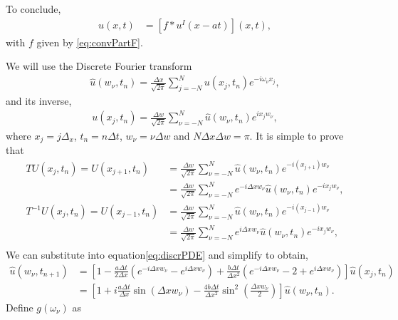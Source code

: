 \begin{questions}
\begin{solution}
To conclude,
\begin{align}
u(x,t)&=\left[f*u^I(x-at)\right](x,t),
\end{align}
with $f$ given by \eqref{eq:convPartF}.

\end{solution}
\newpage
{}
\begin{solution}
We will use the Discrete Fourier transform 
\begin{align}\label{eq:DiscrFourierTransf}
\hat{u}(w_{\nu},t_n)=\frac{\Delta x}{\sqrt{2\pi}}\sum_{j=-N}^N u(x_j,t_n)e^{-i\omega_{\nu} x_j},
\end{align}
and its inverse,
\begin{align}\label{eq:DiscrInvFourierTransf}
u(x_j,t_n)=\frac{\Delta w}{\sqrt{2\pi}}\sum_{\nu=-N}^N \hat{u}(w_{\nu},t_n)e^{ix_jw_{\nu}},
\end{align}
where $x_j = j\Delta_x$, $t_n=n\Delta t$, $w_{\nu}=\nu\Delta w$ and $N\Delta x\Delta w=\pi$. It is simple to prove that
\begin{align*}
TU(x_j,t_n)=U(x_{j+1},t_n)&=\frac{\Delta w}{\sqrt{2\pi}}\sum_{\nu=-N}^N \hat{u}(w_{\nu},t_n)e^{-i(x_{j+1})w_{\nu}}\\
&=\frac{\Delta w}{\sqrt{2\pi}}\sum_{\nu=-N}^N e^{-i\Delta xw_{\nu}}\hat{u}(w_{\nu},t_n)e^{-ix_jw_{\nu}},\\
T^{-1}U(x_j,t_n)=U(x_{j-1},t_n)&=\frac{\Delta w}{\sqrt{2\pi}}\sum_{\nu=-N}^N \hat{u}(w_{\nu},t_n)e^{-i(x_{j-1})w_{\nu}}\\
&=\frac{\Delta w}{\sqrt{2\pi}}\sum_{\nu=-N}^N e^{i\Delta xw_{\nu}}\hat{u}(w_{\nu},t_n)e^{-ix_jw_{\nu}},\\
\end{align*}
We can substitute into equation\eqref{eq:discrPDE} and simplify to obtain,
\begin{align}
\hat{u}(w_{\nu}, t_{n+1}) &= \left[1-\frac{a\Delta t}{ 2\Delta x}(e^{-i\Delta xw_{\nu}}-e^{i\Delta xw_{\nu}})+\frac{b\Delta t}{\Delta x^2}(e^{-i\Delta xw_{\nu}}-2+e^{i\Delta xw_{\nu}})\right]\hat{u}(x_j, t_n)\nonumber\\
&= \left[1+i\frac{a\Delta t}{ \Delta x}\sin\left(\Delta xw_{\nu}\right)-\frac{4b\Delta t}{\Delta x^2}\sin^2\left(\frac{\Delta xw_{\nu}}{2}\right)\right]\hat{u}(w_{\nu}, t_n).
\end{align}
Define $g(\omega_{\nu})$ as
\begin{align}

\end{align}
\end{solution}
\end{questions}
